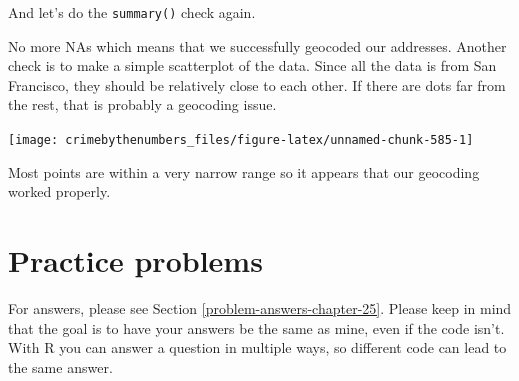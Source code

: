 \documentclass[
]{krantz}
\makeatletter
\newenvironment{Shaded}{\begin{snugshade}}{\end{snugshade}}
\newcommand{\CommentTok}[1]{\textcolor[rgb]{0.37,0.37,0.37}{\textit{#1}}}
\newcommand{\FunctionTok}[1]{\textcolor[rgb]{0,0,0}{#1}}
\newcommand{\NormalTok}[1]{#1}
\newcommand{\SpecialCharTok}[1]{\textcolor[rgb]{0,0,0}{#1}}
\newenvironment{kframe}{%
\medskip{}
\setlength{\fboxsep}{.8em}
 \def\at@end@of@kframe{}%
 \ifinner\ifhmode%
  \def\at@end@of@kframe{\end{minipage}}%
  \begin{minipage}{\columnwidth}%
 \fi\fi%
 \def\FrameCommand##1{\hskip\@totalleftmargin \hskip-\fboxsep
 \colorbox{shadecolor}{##1}\hskip-\fboxsep
     \hskip-\linewidth \hskip-\@totalleftmargin \hskip\columnwidth}%
 \MakeFramed {\advance\hsize-\width
   \@totalleftmargin\z@ \linewidth\hsize
   \@setminipage}}%
 {\par\unskip\endMakeFramed%
 \at@end@of@kframe}
\renewenvironment{Shaded}{\begin{kframe}}{\end{kframe}}
\makeatother
\begin{document}
And let's do the \texttt{summary()} check again.

\begin{Shaded}
\end{Shaded}

\begin{Shaded}
\end{Shaded}

No more NAs which means that we successfully geocoded our addresses. Another check is to make a simple scatterplot of the data. Since all the data is from San Francisco, they should be relatively close to each other. If there are dots far from the rest, that is probably a geocoding issue.

\begin{Shaded}
\end{Shaded}

\begin{center}\texttt{[image: crimebythenumbers\_files/figure-latex/unnamed-chunk-585-1]} \end{center}

Most points are within a very narrow range so it appears that our geocoding worked properly.

\hypertarget{practice-problems-18}{%
\section{Practice problems}\label{practice-problems-18}}

For answers, please see Section \ref{problem-answers-chapter-25}. Please keep in mind that the goal is to have your answers be the same as mine, even if the code isn't. With R you can answer a question in multiple ways, so different code can lead to the same answer.
\end{document}
